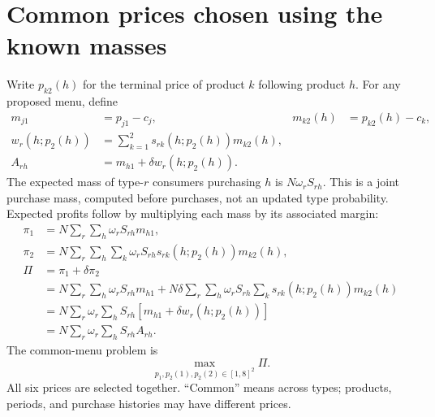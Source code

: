 \documentclass[12pt]{article}
\theoremstyle{definition}
\theoremstyle{remark}
\numberwithin{equation}{section}
\begin{document}
\section{Common prices chosen using the known masses}
Write $p_{k2}(h)$ for the terminal price of product $k$ following product $h$.
For any proposed menu, define
\begin{align}
 m_{j1}&=p_{j1}-c_j,& m_{k2}(h)&=p_{k2}(h)-c_k,\\
 w_r(h;p_2(h))&=\sum_{k=1}^2s_{rk}(h;p_2(h))m_{k2}(h),\\
 A_{rh}&=m_{h1}+\delta w_r(h;p_2(h)).
\end{align}
The expected mass of type-$r$ consumers purchasing $h$ is
$N\omega_rS_{rh}$. This is a joint purchase mass, computed before purchases,
not an updated type probability. Expected profits follow by multiplying each
mass by its associated margin:
\begin{align}
 \pi_1&=N\sum_r\sum_h\omega_rS_{rh}m_{h1},\\
 \pi_2&=N\sum_r\sum_h\sum_k\omega_rS_{rh}
                   s_{rk}(h;p_2(h))m_{k2}(h),\\
 \Pi&=\pi_1+\delta\pi_2\\
 &=N\sum_r\sum_h\omega_rS_{rh}m_{h1}
    +N\delta\sum_r\sum_h\omega_rS_{rh}
                         \sum_k s_{rk}(h;p_2(h))m_{k2}(h)\\
 &=N\sum_r\omega_r\sum_hS_{rh}
                  [m_{h1}+\delta w_r(h;p_2(h))]\\
 &=N\sum_r\omega_r\sum_hS_{rh}A_{rh}.
\end{align}
The common-menu problem is
\[
 \max_{p_1,p_2(1),p_2(2)\in[1,8]^2}\Pi.
\]
All six prices are selected together. ``Common'' means across types; products,
periods, and purchase histories may have different prices.
\end{document}
